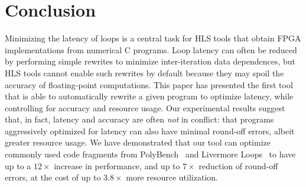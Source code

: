 \section{Conclusion}
\label{sec:conclusion}

Minimizing the latency of loops is a central task for HLS tools that obtain
FPGA implementations from numerical C programs. Loop latency can often be
reduced by performing simple rewrites to minimize inter-iteration data
dependences, but HLS tools cannot enable such rewrites by default because
they may spoil the accuracy of floating-point computations. This paper has
presented the first tool that is able to automatically rewrite a given program
to optimize latency, while controlling for accuracy and resource usage. Our
experimental results suggest that, in fact, latency and accuracy are often
\emph{not} in conflict: that programs aggressively optimized for latency can
also have minimal round-off errors, albeit greater resource usage. We have
demonstrated that our tool can optimize commonly used code fragments from
PolyBench~\cite{polybench} and Livermore Loops~\cite{livermore} to have up to a
$12\times$ increase in performance, and up to $7\times$ reduction of round-off
errors, at the cost of up to $3.8\times$ more resource utilization.

